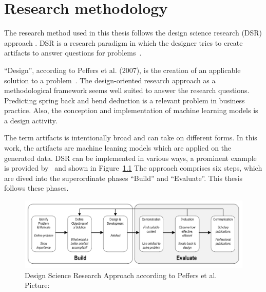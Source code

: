 \chapter{Research methodology}\label{ch:research-methodology}

The research method used in this thesis follows the design science research (DSR) approach
\cite[p. 17]{rennenkampff_managementitagilitaetentwicklung_2015}.
DSR is a research paradigm in which the designer tries to create artifacts to answer questions
for problems~\cite[p. 10]{hevner_designscienceresearch_2010}.

``Design'', according to Peffers et al. (2007), is the creation of an applicable solution to a
problem~\cite[p.47]{peffers_designscienceresearch_2007}.
The design-oriented research approach as a methodological framework seems well suited to answer
the research questions.
Predicting spring back and bend deduction is a relevant problem in business practice.
Also, the conception and implementation of machine learning models is a design activity.

The term artifacts is intentionally broad and can take on different forms.
In this work, the artifacts are machine leaning models which are applied on the generated
data.
DSR can be implemented in various ways, a prominent example is provided by~\cite{
    peffers_designscienceresearch_2007} and shown in Figure~\ref{fig:dsr_process}
The approach comprises six steps, which are dived into the superordinate phases ``Build'' and
``Evaluate''. This thesis follows these phases.

\begin{figure}[H]
    \begin{tcolorbox}[arc=0pt,boxrule=0.5pt]
        \centering
        \includegraphics[width=1\linewidth]{chap3/images/dsr_process.png}
        \caption[DSR Process]{Design Science Research Approach according to Peffers et al.
        Picture: \cite[p. 72]{sonnenberg_evaluationpatternsdesign_2012}}
        \label{fig:dsr_process}
    \end{tcolorbox}
\end{figure}

